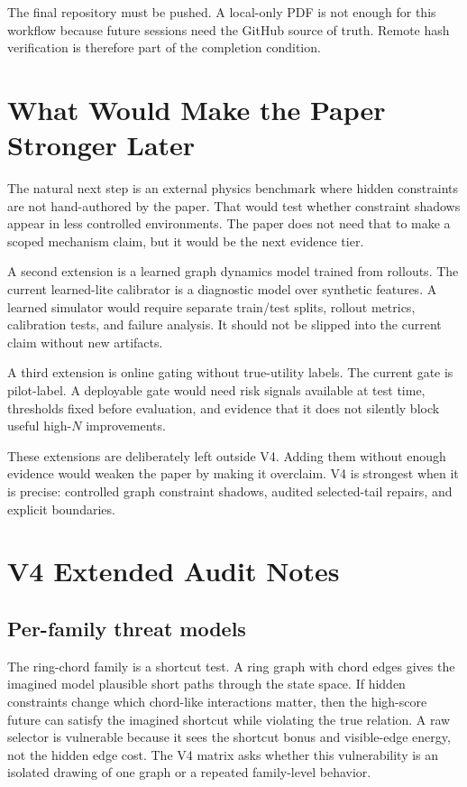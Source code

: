 \documentclass{article}
\begin{document}
The final repository must be pushed.  A local-only PDF is not enough for this
workflow because future sessions need the GitHub source of truth.  Remote hash
verification is therefore part of the completion condition.

\section{What Would Make the Paper Stronger Later}

The natural next step is an external physics benchmark where hidden constraints
are not hand-authored by the paper.  That would test whether constraint shadows
appear in less controlled environments.  The paper does not need that to make a
scoped mechanism claim, but it would be the next evidence tier.

A second extension is a learned graph dynamics model trained from rollouts.  The
current learned-lite calibrator is a diagnostic model over synthetic features.
A learned simulator would require separate train/test splits, rollout metrics,
calibration tests, and failure analysis.  It should not be slipped into the
current claim without new artifacts.

A third extension is online gating without true-utility labels.  The current
gate is pilot-label.  A deployable gate would need risk signals available at
test time, thresholds fixed before evaluation, and evidence that it does not
silently block useful high-\(N\) improvements.

These extensions are deliberately left outside V4.  Adding them without enough
evidence would weaken the paper by making it overclaim.  V4 is strongest when it
is precise: controlled graph constraint shadows, audited selected-tail repairs,
and explicit boundaries.

\section{V4 Extended Audit Notes}

\subsection{Per-family threat models}

The ring-chord family is a shortcut test.  A ring graph with chord edges gives
the imagined model plausible short paths through the state space.  If hidden
constraints change which chord-like interactions matter, then the high-score
future can satisfy the imagined shortcut while violating the true relation.  A
raw selector is vulnerable because it sees the shortcut bonus and visible-edge
energy, not the hidden edge cost.  The V4 matrix asks whether this vulnerability
is an isolated drawing of one graph or a repeated family-level behavior.
\end{document}
